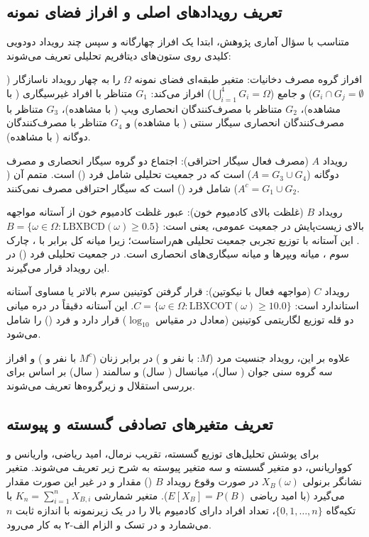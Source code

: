 \documentclass[12pt]{exam}
\begin{document}
\subsection{تعریف رویدادهای اصلی و افراز فضای نمونه}
متناسب با سؤال آماری پژوهش، ابتدا یک افراز چهارگانه و سپس چند رویداد دودویی کلیدی روی ستون‌های دیتافریم تحلیلی تعریف می‌شوند:

افراز گروه مصرف دخانیات: متغیر طبقه‌ای  فضای نمونه $\Omega$ را به چهار رویداد ناسازگار ($G_i \cap G_j = \emptyset$) و جامع ($\bigcup_{i=1}^{4} G_i = \Omega$) افراز می‌کند: $G_1$ متناظر با افراد غیرسیگاری ( با  مشاهده)، $G_2$ متناظر با مصرف‌کنندگان انحصاری ویپ ( با  مشاهده)، $G_3$ متناظر با مصرف‌کنندگان انحصاری سیگار سنتی ( با  مشاهده) و $G_4$ متناظر با مصرف‌کنندگان دوگانه ( با  مشاهده).

رویداد $A$ (مصرف فعال سیگار احتراقی): اجتماع دو گروه سیگار انحصاری و مصرف دوگانه ($A = G_3 \cup G_4$) است که در جمعیت تحلیلی شامل  فرد () است. متمم آن ($A^c = G_1 \cup G_2$) شامل  فرد () است که سیگار احتراقی مصرف نمی‌کنند.

رویداد $B$ (غلظت بالای کادمیوم خون): عبور غلظت کادمیوم خون از آستانه مواجهه بالای زیست‌پایش در جمعیت عمومی، یعنی  است: $B = \{ \omega \in \Omega : \text{LBXBCD}(\omega) \ge 0.5 \}$. این آستانه با توزیع تجربی جمعیت تحلیلی هم‌راستاست؛ زیرا میانه کل برابر با ، چارک سوم ، میانه ویپرها  و میانه سیگاری‌های انحصاری  است. در جمعیت تحلیلی  فرد () در این رویداد قرار می‌گیرند.

رویداد $C$ (مواجهه فعال با نیکوتین): قرار گرفتن کوتینین سرم بالاتر یا مساوی آستانه استاندارد  است: $C = \{ \omega \in \Omega : \text{LBXCOT}(\omega) \ge 10.0 \}$. این آستانه دقیقاً در دره میانی دو قله توزیع لگاریتمی کوتینین (معادل  در مقیاس $\log_{10}$) قرار دارد و  فرد () را شامل می‌شود.

علاوه بر این، رویداد جنسیت مرد ($M$:  با  نفر و ) در برابر زنان ($M^c$ با  نفر و ) و افراز سه گروه سنی جوان ( سال)، میانسال ( سال) و سالمند ( سال) بر اساس  برای بررسی استقلال و زیرگروه‌ها تعریف می‌شوند.

\subsection{تعریف متغیرهای تصادفی گسسته و پیوسته}
برای پوشش تحلیل‌های توزیع گسسته، تقریب نرمال، امید ریاضی، واریانس و کوواریانس، دو متغیر گسسته و سه متغیر پیوسته به شرح زیر تعریف می‌شوند. متغیر نشانگر برنولی $X_B(\omega)$ در صورت وقوع رویداد $B$ () مقدار  و در غیر این صورت مقدار  می‌گیرد (با امید ریاضی $E[X_B] = P(B)$). متغیر شمارشی $K_n = \sum_{i=1}^{n} X_{B,i}$ با تکیه‌گاه $\{0, 1, \dots, n\}$، تعداد افراد دارای کادمیوم بالا را در یک زیرنمونه با اندازه ثابت $n$ می‌شمارد و در تسک  و الزام الف-۲ به کار می‌رود.
\end{document}
